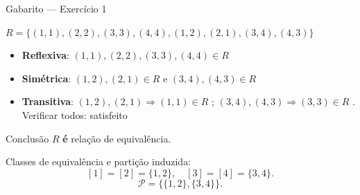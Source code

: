\documentclass[9pt]{beamer}
\begin{document}
\begin{frame}{Gabarito — Exercício 1}

\begin{block}{$R = \{(1,1),(2,2),(3,3),(4,4),(1,2),(2,1),(3,4),(4,3)\}$}
\begin{itemize}
  \item \textbf{Reflexiva}: $(1,1),(2,2),(3,3),(4,4) \in R$ \checkmark
  \item \textbf{Simétrica}: $(1,2),(2,1) \in R$ e $(3,4),(4,3) \in R$ \checkmark
  \item \textbf{Transitiva}: $(1,2),(2,1) \Rightarrow (1,1) \in R$ \checkmark; $(3,4),(4,3) \Rightarrow (3,3) \in R$ \checkmark. Verificar todos: satisfeito \checkmark
\end{itemize}
\end{block}

\begin{block}{Conclusão}
$R$ \textbf{é} relação de equivalência.

Classes de equivalência e partição induzida:
\[
[1] = [2] = \{1,2\}, \quad [3] = [4] = \{3,4\}.
\]
\[
\mathcal{P} = \bigl\{\{1,2\},\{3,4\}\bigr\}.
\]
\end{block}

\end{frame}
\end{document}
